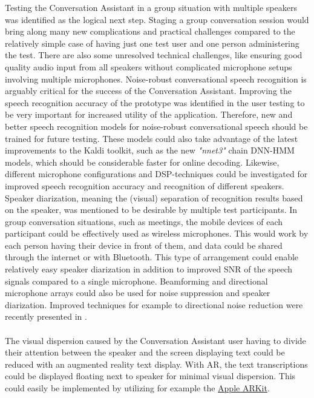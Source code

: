 \documentclass[english, 12pt, a4paper, pdftex, elec, utf8]{aaltothesis}
\begin{document}
Testing the Conversation Assistant in a group situation with multiple speakers was identified as the logical next step. Staging a group conversation session would bring along many new complications and practical challenges compared to the relatively simple case of having just one test user and one person administering the test. There are also some unresolved technical challenges, like ensuring good quality audio input from all speakers without complicated microphone setups involving multiple microphones. Noise-robust conversational speech recognition is arguably critical for the success of the Conversation Assistant. Improving the speech recognition accuracy of the prototype was identified in the user testing to be very important for increased utility of the application. Therefore, new and better speech recognition models for noise-robust conversational speech should be trained for future testing. These models could also take advantage of the latest improvements to the Kaldi toolkit, such as the new \textit{"nnet3"} chain DNN-HMM models, which should be considerable faster for online decoding. Likewise, different microphone configurations and DSP-techniques could be investigated for improved speech recognition accuracy and recognition of different speakers. Speaker diarization, meaning the (visual) separation of recognition results based on the speaker, was mentioned to be desirable by multiple test participants. In group conversation situations, such as meetings, the mobile devices of each participant could be effectively used as wireless microphones. This would work by each person having their device in front of them, and data could be shared through the internet or with Bluetooth. This type of arrangement could enable relatively easy speaker diarization in addition to improved SNR of the speech signals compared to a single microphone. Beamforming and directional microphone arrays could also be used for noise suppression and speaker diarization. Improved techniques for example to directional noise reduction were recently presented in \cite{delikaris2017parametric}. \\\\
The visual dispersion caused by the Conversation Assistant user having to divide their attention between the speaker and the screen displaying text could be reduced with an augmented reality text display. With AR, the text transcriptions could be displayed floating next to speaker for minimal visual dispersion. This could easily be implemented by utilizing for example the \href{https://developer.apple.com/arkit/}{Apple ARKit}.
\end{document}
